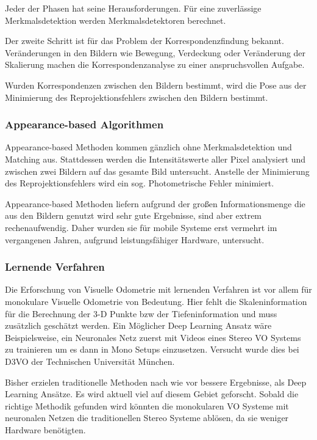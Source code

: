 Jeder der Phasen hat seine Herausforderungen. Für eine zuverlässige Merkmalsdetektion werden Merkmalsdetektoren berechnet. 

Der zweite Schritt ist für das Problem der Korrespondenzfindung bekannt. Veränderungen in den Bildern wie Bewegung, Verdeckung oder Veränderung der Skalierung machen die Korrespondenzanalyse zu einer anspruchsvollen Aufgabe. 

Wurden Korrespondenzen zwischen den Bildern bestimmt, wird die Pose aus der Minimierung des Reprojektionsfehlers zwischen den Bildern bestimmt. 
%
\subsubsection{Appearance-based Algorithmen}
Appearance-based Methoden kommen gänzlich ohne Merkmalsdetektion und Matching aus. Stattdessen werden die Intensitätswerte aller Pixel analysiert und zwischen zwei Bildern auf das gesamte Bild untersucht. Anstelle der Minimierung des Reprojektionsfehlers wird ein sog. Photometrische Fehler minimiert.


Appearance-based Methoden liefern aufgrund der gro{\ss}en Informationsmenge die aus den Bildern genutzt wird sehr gute Ergebnisse, sind aber extrem rechenaufwendig. Daher wurden sie für mobile Systeme erst vermehrt im vergangenen Jahren, aufgrund leistungsfähiger Hardware, untersucht.

\subsubsection{Lernende Verfahren}

Die Erforschung von Visuelle Odometrie mit lernenden Verfahren ist vor allem für monokulare Visuelle Odometrie von Bedeutung. Hier fehlt die Skaleninformation für die Berechnung der 3-D Punkte bzw der Tiefeninformation und muss zusätzlich geschätzt werden. Ein Möglicher Deep Learning Ansatz wäre Beispielsweise, ein Neuronales Netz zuerst mit Videos eines Stereo VO Systems zu trainieren um es dann in Mono Setups einzusetzen. Versucht wurde dies bei D3VO der Technischen Universität München. \cite{yang2018dvso}
\newline

Bisher erzielen traditionelle Methoden nach wie vor bessere Ergebnisse, als Deep Learning Ansätze. Es wird aktuell viel auf diesem Gebiet geforscht. Sobald die richtige Methodik gefunden wird könnten die monokularen VO Systeme mit neuronalen Netzen die traditionellen Stereo Systeme ablösen, da sie weniger Hardware benötigten.  
